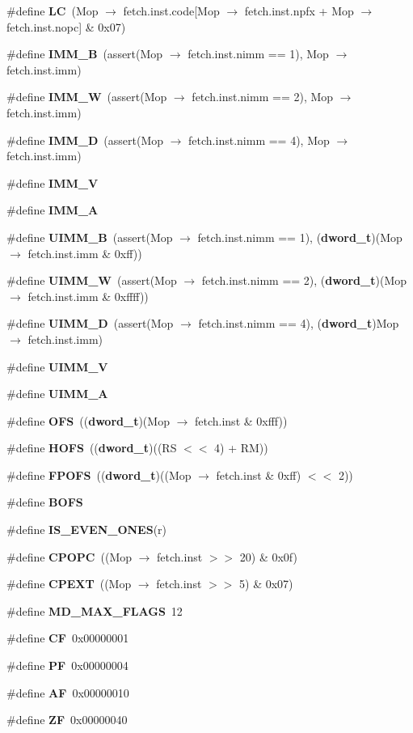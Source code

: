 \begin{CompactItemize}
\item 
\#define {\bf LC}~(Mop $\rightarrow$ fetch.inst.code[Mop $\rightarrow$ fetch.inst.npfx + Mop $\rightarrow$ fetch.inst.nopc] \& 0x07)
\item 
\#define {\bf IMM\_\-B}~(assert(Mop $\rightarrow$ fetch.inst.nimm == 1), Mop $\rightarrow$ fetch.inst.imm)
\item 
\#define {\bf IMM\_\-W}~(assert(Mop $\rightarrow$ fetch.inst.nimm == 2), Mop $\rightarrow$ fetch.inst.imm)
\item 
\#define {\bf IMM\_\-D}~(assert(Mop $\rightarrow$ fetch.inst.nimm == 4), Mop $\rightarrow$ fetch.inst.imm)
\item 
\#define {\bf IMM\_\-V}
\item 
\#define {\bf IMM\_\-A}
\item 
\#define {\bf UIMM\_\-B}~(assert(Mop $\rightarrow$ fetch.inst.nimm == 1), ({\bf dword\_\-t})(Mop $\rightarrow$ fetch.inst.imm \& 0xff))
\item 
\#define {\bf UIMM\_\-W}~(assert(Mop $\rightarrow$ fetch.inst.nimm == 2), ({\bf dword\_\-t})(Mop $\rightarrow$ fetch.inst.imm \& 0xffff))
\item 
\#define {\bf UIMM\_\-D}~(assert(Mop $\rightarrow$ fetch.inst.nimm == 4), ({\bf dword\_\-t})Mop $\rightarrow$ fetch.inst.imm)
\item 
\#define {\bf UIMM\_\-V}
\item 
\#define {\bf UIMM\_\-A}
\item 
\#define {\bf OFS}~(({\bf dword\_\-t})(Mop $\rightarrow$ fetch.inst \& 0xfff))
\item 
\#define {\bf HOFS}~(({\bf dword\_\-t})((RS $<$$<$ 4) + RM))
\item 
\#define {\bf FPOFS}~(({\bf dword\_\-t})((Mop $\rightarrow$ fetch.inst \& 0xff) $<$$<$ 2))
\item 
\#define {\bf BOFS}
\item 
\#define {\bf IS\_\-EVEN\_\-ONES}(r)
\item 
\#define {\bf CPOPC}~((Mop $\rightarrow$ fetch.inst $>$$>$ 20) \& 0x0f)
\item 
\#define {\bf CPEXT}~((Mop $\rightarrow$ fetch.inst $>$$>$ 5) \& 0x07)
\item 
\#define {\bf MD\_\-MAX\_\-FLAGS}~12
\item 
\#define {\bf CF}~0x00000001
\item 
\#define {\bf PF}~0x00000004
\item 
\#define {\bf AF}~0x00000010
\item 
\#define {\bf ZF}~0x00000040

\end{CompactItemize}
